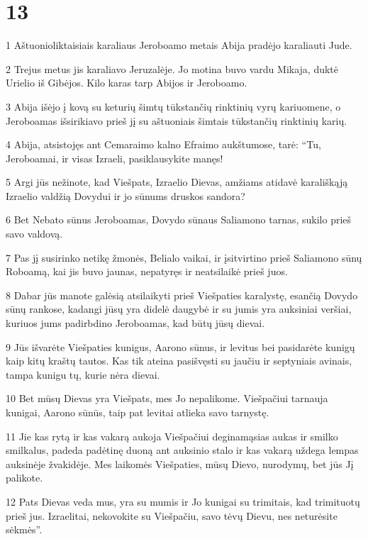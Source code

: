 \chapter{13}

\par 1 Aštuonioliktaisiais karaliaus Jeroboamo metais Abija pradėjo karaliauti Jude. 
\par 2 Trejus metus jis karaliavo Jeruzalėje. Jo motina buvo vardu Mikaja, duktė Urielio iš Gibėjos. Kilo karas tarp Abijos ir Jeroboamo. 
\par 3 Abija išėjo į kovą su keturių šimtų tūkstančių rinktinių vyrų kariuomene, o Jeroboamas išsirikiavo prieš jį su aštuoniais šimtais tūkstančių rinktinių karių. 
\par 4 Abija, atsistojęs ant Cemaraimo kalno Efraimo aukštumose, tarė: “Tu, Jeroboamai, ir visas Izraeli, pasiklausykite manęs! 
\par 5 Argi jūs nežinote, kad Viešpats, Izraelio Dievas, amžiams atidavė karališkąją Izraelio valdžią Dovydui ir jo sūnums druskos sandora? 
\par 6 Bet Nebato sūnus Jeroboamas, Dovydo sūnaus Saliamono tarnas, sukilo prieš savo valdovą. 
\par 7 Pas jį susirinko netikę žmonės, Belialo vaikai, ir įsitvirtino prieš Saliamono sūnų Roboamą, kai jis buvo jaunas, nepatyręs ir neatsilaikė prieš juos. 
\par 8 Dabar jūs manote galėsią atsilaikyti prieš Viešpaties karalystę, esančią Dovydo sūnų rankose, kadangi jūsų yra didelė daugybė ir su jumis yra auksiniai veršiai, kuriuos jums padirbdino Jeroboamas, kad būtų jūsų dievai. 
\par 9 Jūs išvarėte Viešpaties kunigus, Aarono sūnus, ir levitus bei pasidarėte kunigų kaip kitų kraštų tautos. Kas tik ateina pasišvęsti su jaučiu ir septyniais avinais, tampa kunigu tų, kurie nėra dievai. 
\par 10 Bet mūsų Dievas yra Viešpats, mes Jo nepalikome. Viešpačiui tarnauja kunigai, Aarono sūnūs, taip pat levitai atlieka savo tarnystę. 
\par 11 Jie kas rytą ir kas vakarą aukoja Viešpačiui deginamąsias aukas ir smilko smilkalus, padeda padėtinę duoną ant auksinio stalo ir kas vakarą uždega lempas auksinėje žvakidėje. Mes laikomės Viešpaties, mūsų Dievo, nurodymų, bet jūs Jį palikote. 
\par 12 Pats Dievas veda mus, yra su mumis ir Jo kunigai su trimitais, kad trimituotų prieš jus. Izraelitai, nekovokite su Viešpačiu, savo tėvų Dievu, nes neturėsite sėkmės”. 
